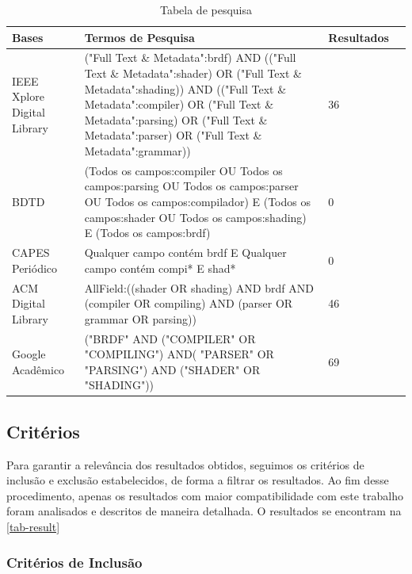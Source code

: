 \documentclass[english, 
               brazil, 
               bsc] %
               {dcomp-abntex2}
\begin{document}
\begin{table}[H]
\ABNTEXfontereduzida
\caption[bases]{Tabela de pesquisa}
\label{tab-bases}
\begin{tabular}{p{2.6cm}|p{6.0cm}|p{2.25cm}|p{3.40cm}}
   \textbf{Bases} & \textbf{Termos de Pesquisa}  & \textbf{Resultados}\\
   \hline
    IEEE Xplore Digital Library
    &
    ("Full Text \& Metadata":brdf)
AND (("Full Text \& Metadata":shader) OR  ("Full Text \& Metadata":shading))
AND (("Full Text \& Metadata":compiler) OR  ("Full Text \& Metadata":parsing) OR  ("Full Text \& Metadata":parser) OR  ("Full Text \& Metadata":grammar))
   & 36
    \\ \hline


    BDTD
    & (Todos os campos:compiler OU Todos os campos:parsing OU Todos os campos:parser OU Todos os campos:compilador) E (Todos os campos:shader OU Todos os campos:shading) E (Todos os campos:brdf)
    & 0
    \\ \hline
    CAPES Periódico
    &  Qualquer campo contém brdf E 
 Qualquer campo contém compi* E shad*  
    & 0
    \\ \hline


  ACM Digital Library
  & AllField:((shader OR shading) AND brdf AND (compiler OR compiling) AND (parser OR grammar OR parsing))
  & 46
    \\ \hline


 Google Acadêmico 
  & 
  ("BRDF" AND ("COMPILER" OR "COMPILING") AND( "PARSER" OR "PARSING") AND ("SHADER" OR "SHADING"))
  & 69
\end{tabular}
\end{table}


\subsection{Critérios}


Para garantir a relevância dos resultados obtidos, seguimos os critérios de inclusão e exclusão estabelecidos, de forma a filtrar os resultados. Ao fim desse procedimento, apenas os resultados com maior compatibilidade com este trabalho foram analisados e descritos de maneira detalhada. O resultados se encontram na \autoref{tab-result}


\subsubsection{Critérios de Inclusão}
\end{document}
